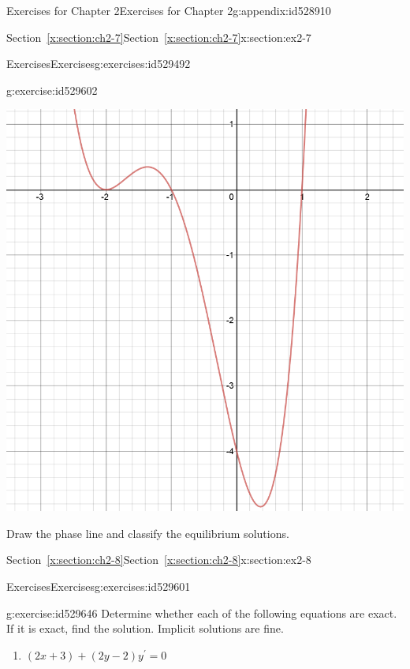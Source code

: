 \documentclass[oneside,10pt,]{book}
\newcommand{\xreffont}{\relax}
\numberwithin{equation}{section}
\numberwithin{equation}{section}
\begin{document}
\begin{appendixptx}{Exercises for Chapter 2}{}{Exercises for Chapter 2}{}{}{g:appendix:id528910}
\begin{sectionptx}{Section~{\xreffont\ref*{x:section:ch2-7}}}{}{Section~{\xreffont\ref*{x:section:ch2-7}}}{}{}{x:section:ex2-7}
\begin{exercises-subsection-numberless}{Exercises}{}{Exercises}{}{}{g:exercises:id529492}
\begin{divisionexercise}{4}{}{}{g:exercise:id529602}
\begin{image}{0}{1}{0}
\includegraphics[width=\linewidth]{images/2.7-4.png}
\end{image}%
Draw the phase line and classify the equilibrium solutions.%
\end{divisionexercise}%
\end{exercises-subsection-numberless}
\end{sectionptx}
%
%
\typeout{************************************************}
\typeout{Section C.8 Section~{\xreffont\ref*{x:section:ch2-8}}}
\typeout{************************************************}
%
\begin{sectionptx}{Section~{\xreffont\ref*{x:section:ch2-8}}}{}{Section~{\xreffont\ref*{x:section:ch2-8}}}{}{}{x:section:ex2-8}
%
%
\typeout{************************************************}
\typeout{************************************************}
%
\begin{exercises-subsection-numberless}{Exercises}{}{Exercises}{}{}{g:exercises:id529601}
\begin{divisionexercise}{1}{}{}{g:exercise:id529646}%
Determine whether each of the following equations are exact. If it is exact, find the solution. Implicit solutions are fine.%
%
\begin{enumerate}[label=(\alph*)]
\item{}\(\displaystyle \left(2x+3\right)+\left(2y-2\right)y^{\prime}=0\)%

\end{enumerate}
\end{divisionexercise}
\end{exercises-subsection-numberless}
\end{sectionptx}
\end{appendixptx}
\end{document}
